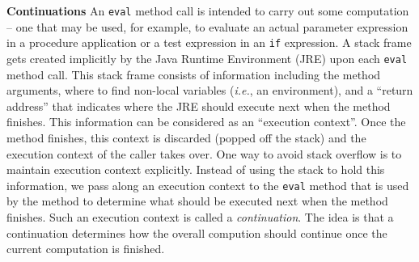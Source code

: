 \begin{minipage}[t]{\sw}
\slidenumber
\LARGE
{\bf Continuations}\exx
An \verb'eval' method call is intended
to carry out some computation --
one that may be used, for example,
to evaluate an actual parameter expression in a procedure application
or a test expression in an \verb'if' expression.
A stack frame gets created implicitly
by the Java Runtime Environment (JRE)
upon each \verb'eval' method call.
This stack frame consists of information
including the method arguments,
where to find non-local variables ({\em i.e.}, an environment),
and a ``return address'' that indicates
where the JRE should execute next when the method finishes.
This information can be considered as an ``execution context''.
Once the method finishes, this context is discarded
(popped off the stack)
and the execution context of the caller takes over.\exx
One way to avoid stack overflow
is to maintain execution context explicitly.
Instead of using the stack to hold this information,
we pass along an execution context to the \verb'eval' method
that is used by the method
to determine what should be executed next
when the method finishes.
Such an execution context is called a {\em continuation}.
The idea is that a continuation determines
how the overall compution should continue
once the current computation is finished.
\end{minipage}

